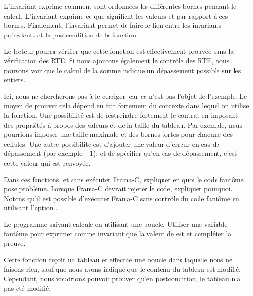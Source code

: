 L'invariant  exprime comment sont ordonnées les différentes bornes
pendant le calcul. L'invariant  exprime ce que signifient les
valeurs  et  par rapport à ces bornes. Finalement,
l'invariant  permet de faire le lien entre les invariants précédents
et la postcondition de la fonction.



Le lecteur pourra vérifier que cette fonction est effectivement prouvée sans la
vérification des RTE. Si nous ajoutons également le contrôle des RTE, nous pouvons
voir que le calcul de la somme indique un dépassement possible sur les entiers.



Ici, nous ne chercherons pas à le corriger, car ce n'est pas l'objet de l'exemple.
Le moyen de prouver cela dépend en fait fortement du contexte dans lequel on
utilise la fonction. Une possibilité est de restreindre fortement le contrat en
imposant des propriétés à propos des valeurs et de la taille du tableau. Par
exemple, nous pourrions imposer une taille maximale et des bornes fortes pour
chacune des cellules. Une autre possibilité est d'ajouter une valeur d'erreur
en cas de dépassement (par exemple $-1$), et de spécifier qu'en cas de
dépassement, c'est cette valeur qui est renvoyée.







Dans ces fonctions, et sans exécuter Frama-C, expliquer en quoi le code fantôme
pose problème. Lorsque Frama-C devrait rejeter le code, expliquer pourquoi.
Notons qu'il est possible d'exécuter Frama-C sans contrôle du code fantôme en
utilisant l'option .






Le programme suivant calcule  en utilisant une boucle.
Utiliser une variable fantôme  pour exprimer comme invariant que
la valeur de  est  et compléter la preuve.






Cette fonction reçoit un tableau et effectue une boucle dans laquelle nous ne
faisons rien, sauf que nous avons indiqué que le contenu du tableau est modifié.
Cependant, nous voudrions pouvoir prouver qu'en postcondition, le tableau n'a
pas été modifié.


